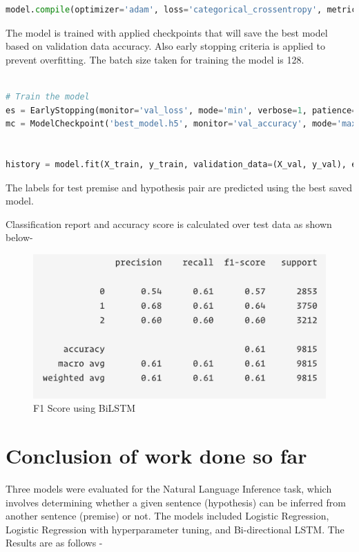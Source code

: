 \begin{lstlisting}[language=Python]
model.compile(optimizer='adam', loss='categorical_crossentropy', metrics=['accuracy'], run_eagerly=True)
\end{lstlisting}

The model is trained with applied checkpoints that will save the best model based on validation data accuracy. Also early stopping criteria is applied to prevent overfitting. The batch size taken for training the model is 128.


\begin{lstlisting}[language=Python]

# Train the model
es = EarlyStopping(monitor='val_loss', mode='min', verbose=1, patience=3)
mc = ModelCheckpoint('best_model.h5', monitor='val_accuracy', mode='max', verbose=1, save_best_only=True)


history = model.fit(X_train, y_train, validation_data=(X_val, y_val), epochs=20, batch_size=128, callbacks=[mc, es])


\end{lstlisting}


The labels for test premise and hypothesis pair are predicted using the best saved model.

Classification report and accuracy score is calculated over test data as shown below-
\pagebreak

\begin{figure}[h]
	\centering
	\includegraphics[scale=0.7]{img/bilstmf1.png}
	\caption{F1 Score using BiLSTM}
\end{figure}


\section{Conclusion of work done so far}
Three models were evaluated for the Natural Language Inference task, which involves determining whether a given sentence (hypothesis) can be inferred from another sentence (premise) or not. The models included Logistic Regression, Logistic Regression with hyperparameter tuning, and Bi-directional LSTM. The Results are as follows - 

